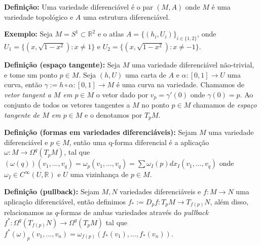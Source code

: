 \documentclass{article}
\begin{document}
	\vspace{2 mm}
	\textbf{Definição:} Uma variedade diferenciável é o par $(M, A)$ onde $M$ é uma variedade topológico e $A$ uma estrutura diferenciável. 
	
	\vspace{2 mm}
	\textbf{Exemplo:} Seja $M = S^{1} \subset \mathbb{R}^{2}$ e o atlas $A = \{(h_{i}, U_{i})\}_{i \in \{1,2\}}$, onde $U_{1} = \{(x, \sqrt{1-x^{2}}): x \neq 1 \}$ e  $U_{2} = \{(x, \sqrt{1-x^{2}}): x \neq -1 \}$.
	
	\vspace{2 mm}
	\textbf{Definição (espaço tangente):} Seja $M$ uma variedade diferenciável não-trivial, e tome um ponto $p \in M$. Seja $(h, U)$ uma carta de $A$ e $\alpha : [0,1] \to U$ uma curva, então $\gamma := h \circ \alpha : [0,1] \to M$ é uma curva na variedade. Chamamos de \textit{vetor tangent a $M$ em $p \in M$} o vetor dado por $v_{p} = \gamma'(0)$ onde $\gamma(0) =p$. Ao conjunto de todos os vetores tangentes a $M$ no ponto $p \in M$ chamamos de \textit{espaço tangente de $M$ em $p \in M$} e o denotamos por $T_{p}M$.
	
	\vspace{2 mm}
	\textbf{Definição (formas em variedades diferenciáveis):} Sejam $M$ uma variedade diferenciável e $p \in M$, então uma q-forma diferencial é a aplicação $\omega : M \to \Omega^{q}(T_{p}M)$, tal que $(\omega(q))(v_{1}, \dots, v_{q}) = \omega_{p}(v_{1}, \dots, v_{q}) = \sum \omega_{I}(p)dx_{I}(v_{1}, \dots, v_{q})$ onde $\omega_{I} \in C^{\infty}(U, \mathbb{R})$ e $U$ uma vizinhança de $p \in M$.
	
	\vspace{2 mm}
	\textbf{Definição (pullback):} Sejam $M,N$ variedades diferenciáveis e $f: M \to N$ uma aplicação diferenciável, então definimos $f_{*} := D_{p}f:T_{p}M \to T_{f(p)}N$, além disso, relacionamos as $q$-formas de ambas variedades através do \textit{pullback} $f^{*} : \Omega^{q}(T_{f(p)}N) \to \Omega^{q}(T_{p}M)$ tal que $
	f^{*}(\omega)_{p}(v_{1}, \dots, v_{n}) = \omega_{f(p)}(f_{*}(v_{1}), \dots, f_{*}(v_{n}))$.
	
\end{document}
